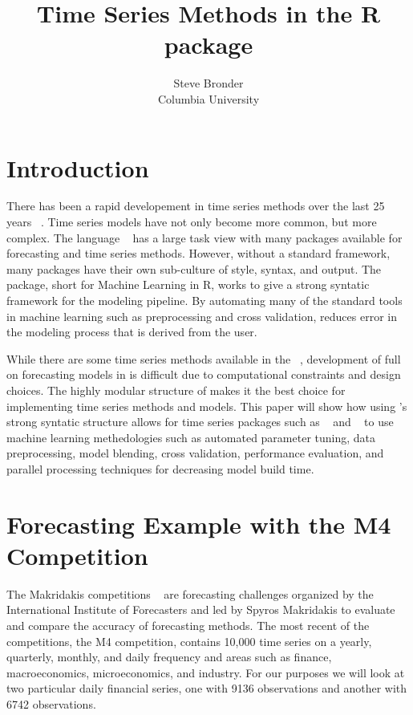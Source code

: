 \documentclass[article]{jss}\usepackage[]{graphicx}\usepackage[]{color}
\author{Steve Bronder\\ Columbia University}
\title{Time Series Methods in the R package \pkg{MLR}}
\begin{document}

\section{Introduction}

There has been a rapid developement in time series methods over the last 25 years ~\cite{Hyndman25}. Time series models have not only become more common, but more complex. The  language ~\cite{Rbase} has a large task view with many packages available for forecasting and time series methods. However, without a standard framework, many packages have their own sub-culture of style, syntax, and output. The  ~\cite{mlr} package, short for Machine Learning in R, works to give a strong syntatic framework for the modeling pipeline. By automating many of the standard tools in machine learning such as preprocessing and cross validation,  reduces error in the modeling process that is derived from the user. 

While there are some time series methods available in the  ~\cite{caret}, development of full on forecasting models in  is difficult due to computational constraints and design choices. The highly modular structure of  makes it the best choice for implementing time series methods and models. This paper will show how using 's strong syntatic structure allows for time series packages such as  ~\cite{HyndForecast} and  ~\cite{rugarch} to use machine learning methedologies such as automated parameter tuning, data preprocessing, model blending, cross validation, performance evaluation, and parallel processing techniques for decreasing model build time.

\section{Forecasting Example with the M4 Competition}

The Makridakis competitions ~\cite{Makridakis2000451} are forecasting challenges organized by the International Institute of Forecasters and led by Spyros Makridakis to evaluate and compare the accuracy of forecasting methods. The most recent of the competitions, the M4 competition, contains 10,000 time series on a yearly, quarterly, monthly, and daily frequency and areas such as finance, macroeconomics, microeconomics, and industry. For our purposes we will look at two particular daily financial series, one with 9136 observations and another with 6742 observations.
\end{document}
